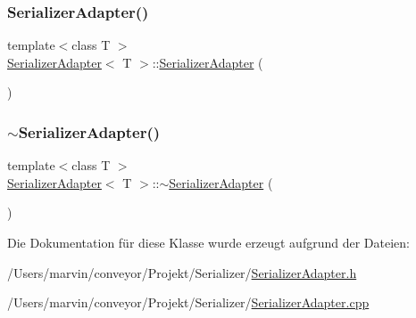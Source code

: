 \subsubsection{\texorpdfstring{Serializer\+Adapter()}{SerializerAdapter()}}
{\footnotesize\ttfamily template$<$class T $>$ \\
\hyperlink{class_serializer_adapter}{Serializer\+Adapter}$<$ T $>$\+::\hyperlink{class_serializer_adapter}{Serializer\+Adapter} (\begin{DoxyParamCaption}{ }\end{DoxyParamCaption})}

\hypertarget{class_serializer_adapter_ab768851e14fa435e50f4d39faacaea89}{}\label{class_serializer_adapter_ab768851e14fa435e50f4d39faacaea89} 
\subsubsection{\texorpdfstring{$\sim$\+Serializer\+Adapter()}{~SerializerAdapter()}}
{\footnotesize\ttfamily template$<$class T $>$ \\
\hyperlink{class_serializer_adapter}{Serializer\+Adapter}$<$ T $>$\+::$\sim$\hyperlink{class_serializer_adapter}{Serializer\+Adapter} (\begin{DoxyParamCaption}{ }\end{DoxyParamCaption})\hspace{0.3cm}{\ttfamily [virtual]}}



Die Dokumentation für diese Klasse wurde erzeugt aufgrund der Dateien\+:\begin{DoxyCompactItemize}
\item 
/\+Users/marvin/conveyor/\+Projekt/\+Serializer/\hyperlink{_serializer_adapter_8h}{Serializer\+Adapter.\+h}\item 
/\+Users/marvin/conveyor/\+Projekt/\+Serializer/\hyperlink{_serializer_adapter_8cpp}{Serializer\+Adapter.\+cpp}\end{DoxyCompactItemize}
